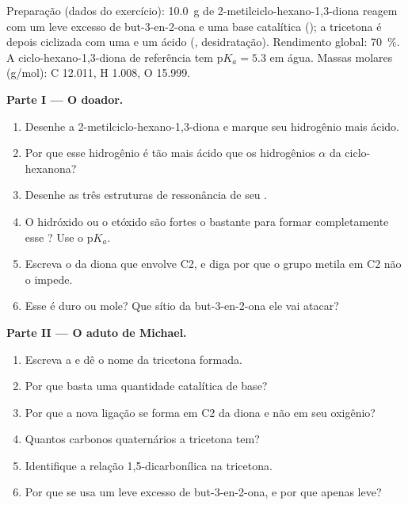 \begin{problem}
\label{pb:b2:conjugate-additions:1}
Preparação (dados do exercício): \qty{10.0}{g} de 2-metilciclo-hexano-1,3-diona reagem com um leve
excesso de but-3-en-2-ona e uma base catalítica (); a tricetona é depois ciclizada com
uma  e um ácido (, desidratação). Rendimento global: 70~\%. A
ciclo-hexano-1,3-diona de referência tem $\mathrm pK_a = 5.3$ em água. Massas molares (\unit{g/mol}): C 12.011, H 1.008, O 15.999.

\medskip
\noindent\textbf{Parte I --- O doador.}
\begin{enumerate}
  \item Desenhe a 2-metilciclo-hexano-1,3-diona e marque seu hidrogênio mais ácido.
  \item Por que esse hidrogênio é tão mais ácido que os hidrogênios $\alpha$ da ciclo-hexanona?
  \item Desenhe as três estruturas de ressonância de seu .
  \item O hidróxido ou o etóxido são fortes o bastante para formar completamente esse ? Use o $\mathrm pK_a$.
  \item Escreva o  da diona que envolve C2, e diga por que o grupo metila em C2 não
        o impede.
  \item Esse  é duro ou mole? Que sítio da but-3-en-2-ona ele vai atacar?
\end{enumerate}

\medskip
\noindent\textbf{Parte II --- O aduto de Michael.}
\begin{enumerate}[resume]
  \item Escreva a  e dê o nome da tricetona formada.
  \item Por que basta uma quantidade catalítica de base?
  \item Por que a nova ligação se forma em C2 da diona e não em seu oxigênio?
  \item Quantos carbonos quaternários a tricetona tem?
  \item Identifique a relação 1,5-dicarbonílica na tricetona.
  \item Por que se usa um leve excesso de but-3-en-2-ona, e por que apenas leve?
\end{enumerate}


\end{problem}
